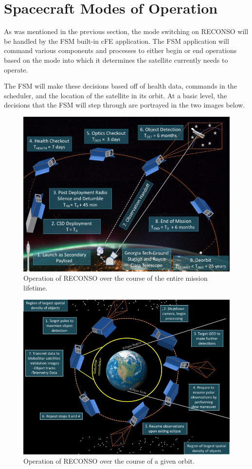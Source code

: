 \documentclass{article}
\begin{document}
\clearpage
\section{Spacecraft Modes of Operation}

As was mentioned in the previous section, the mode switching on RECONSO will be handled by the FSM built-in cFE application. The FSM application will command various components and processes to either begin or end operations based on the mode into which it determines the satellite currently needs to operate. 

The FSM will make these decisions based off of health data, commands in the scheduler, and the location of the satellite in its orbit. At a basic level, the decisions that the FSM will step through are portrayed in the two images below.

\begin{figure}[h!]
\centering
\caption{Operation of RECONSO over the course of the entire mission lifetime.}
\includegraphics[width=.7\textwidth]{OV1.jpg}
\end{figure}

\begin{figure}[h!]
\centering
\caption{Operation of RECONSO over the course of a given orbit.}
\includegraphics[width=.7\textwidth]{OV2.jpg}
\end{figure}
\end{document}

